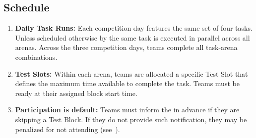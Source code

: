 \subsection{Schedule}\label{rule:schedule}

\begin{enumerate}
	\item \textbf{Daily Task Runs:}
	Each competition day features the same set of four tasks.
	Unless scheduled otherwise by \LOC{} the same task is executed in parallel across all arenas.
	Across the three competition days, teams complete all task-arena combinations.

	\item \textbf{Test Slots:} Within each arena, teams are allocated a specific Test Slot that defines the maximum time available to complete the task. 
    Teams must be ready at their assigned block start time.

	\item \textbf{Participation is default:} Teams must inform the \OC{} in advance if they are skipping a Test Block. If they do not provide such notification, they may be penalized for not attending (see~).
	
\end{enumerate}


